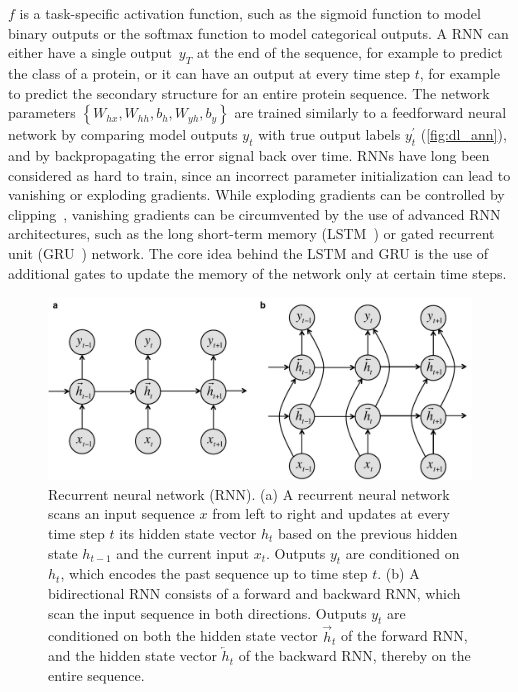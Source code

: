 $f$ is a task-specific activation function, such as the sigmoid function to model binary outputs or the softmax function to model categorical outputs. A RNN can either have a single output~$y_T$ at the end of the sequence, for example to predict the class of a protein, or it can have an output at every time step $t$, for example to predict the secondary structure for an entire protein sequence. The network parameters $\left\{W_{hx},W_{hh},b_h,W_{yh},b_y\right\}$ are trained similarly to a feedforward neural network by comparing model outputs $y_t$ with true output labels $y^\prime_t$ (\autoref{fig:dl_ann}), and by backpropagating the error signal back over time. RNNs have long been considered as hard to train, since an incorrect parameter initialization can lead to vanishing or exploding gradients. While exploding gradients can be controlled by clipping~\citep{pascanu_difficulty_2013}, vanishing gradients can be circumvented by the use of advanced RNN architectures, such as the long short-term memory (LSTM~\citep{hochreiter_long_1997}) or gated recurrent unit (GRU~\citep{chung_empirical_2014}) network. The core idea behind the LSTM and GRU is the use of additional gates to update the memory of the network only at certain time steps.

\begin{figure}[htbp!]
\centering
\includegraphics[width=1.0\textwidth]{rnn}
\caption[Recurrent neural network (RNN).]{Recurrent neural network (RNN). (a) A recurrent neural network scans an input sequence $x$ from left to right and updates at every time step $t$ its hidden state vector $h_t$ based on the previous hidden state $h_{t-1}$ and the current input $x_t$. Outputs $y_t$ are conditioned on $h_t$, which encodes the past sequence up to time step $t$. (b) A bidirectional RNN consists of a forward and backward RNN, which scan the input sequence in both directions. Outputs $y_t$ are conditioned on both the hidden state vector $\overrightarrow{h}_t$ of the forward RNN, and the hidden state vector $\overleftarrow{h}_t$ of the backward RNN, thereby on the entire sequence.}
\label{fig:rnn}
\end{figure}


